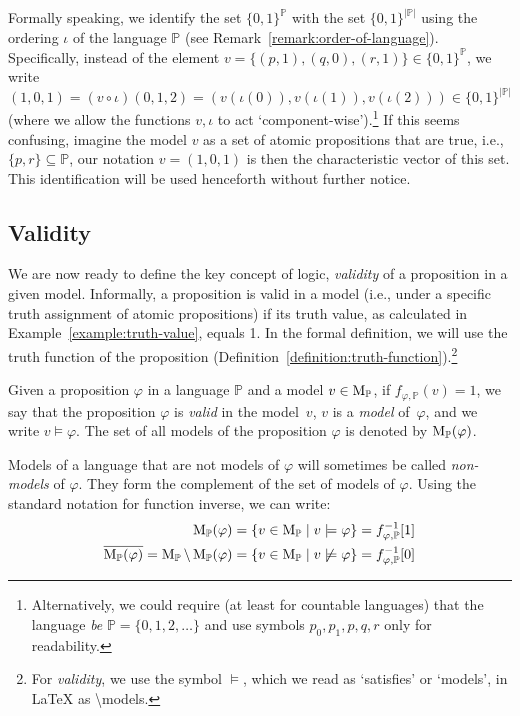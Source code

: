 \begin{remark}
Formally speaking, we identify the set $\{0,1\}^\mathbb{P}$ with the set $\{0,1\}^{|\mathbb{P}|}$ using the ordering $\iota$ of the language $\mathbb{P}$ (see Remark~\ref{remark:order-of-language}). Specifically, instead of the element $v = \{(p,1),(q,0),(r,1)\} \in \{0,1\}^\mathbb{P}$, we write $(1,0,1) = (v \circ \iota)(0,1,2) = (v(\iota(0)),v(\iota(1)),v(\iota(2))) \in \{0,1\}^{|\mathbb{P}|}$ (where we allow the functions $v,\iota$ to act `component-wise').\footnote{Alternatively, we could require (at least for countable languages) that the language \emph{be} $\mathbb{P} = \{0,1,2,\dots\}$ and use symbols $p_0,p_1,p,q,r$ only for readability.} If this seems confusing, imagine the model $v$ as a set of atomic propositions that are true, i.e., $\{p,r\} \subseteq \mathbb{P}$, our notation $v = (1,0,1)$ is then the characteristic vector of this set. This identification will be used henceforth without further notice. 
\end{remark}


\subsection{Validity}

We are now ready to define the key concept of logic, \emph{validity} of a proposition in a given model. Informally, a proposition is valid in a model (i.e., under a specific truth assignment of atomic propositions) if its truth value, as calculated in Example~\ref{example:truth-value}, equals 1. In the formal definition, we will use the truth function of the proposition (Definition~\ref{definition:truth-function}).\footnote{For \emph{validity}, we use the symbol $\models$, which we read as `satisfies' or `models', in {\LaTeX} as {\textbackslash}models.}

\begin{definition}\label{definition:validity}
    Given a proposition $\varphi$ in a language $\mathbb{P}$ and a model $v \in \operatorname{M}_\mathbb{P}$, if $f_{\varphi,\mathbb{P}}(v) = 1$, we say that the proposition $\varphi$ is \emph{valid} in the model~$v$, $v$ is a \emph{model} of~$\varphi$, and we write $v \models \varphi$. The set of all models of the proposition $\varphi$ is denoted by $\operatorname{M}_\mathbb{P}(\varphi)$.
\end{definition}
Models of a language that are not models of $\varphi$ will sometimes be called \emph{non-models} of $\varphi$. They form the complement of the set of models of $\varphi$. Using the standard notation for function inverse, we can write:
\begin{align*}
    \operatorname{M}_\mathbb{P}(\varphi) &= \{v \in \operatorname{M}_\mathbb{P} \mid v \models \varphi\} = f_{\varphi,\mathbb{P}}^{-1}[1]\\
    \overline{\operatorname{M}_\mathbb{P}(\varphi)} = \operatorname{M}_\mathbb{P} \setminus \operatorname{M}_\mathbb{P}(\varphi) &= \{v \in \operatorname{M}_\mathbb{P} \mid v \not\models \varphi\} = f_{\varphi,\mathbb{P}}^{-1}[0]
\end{align*}

